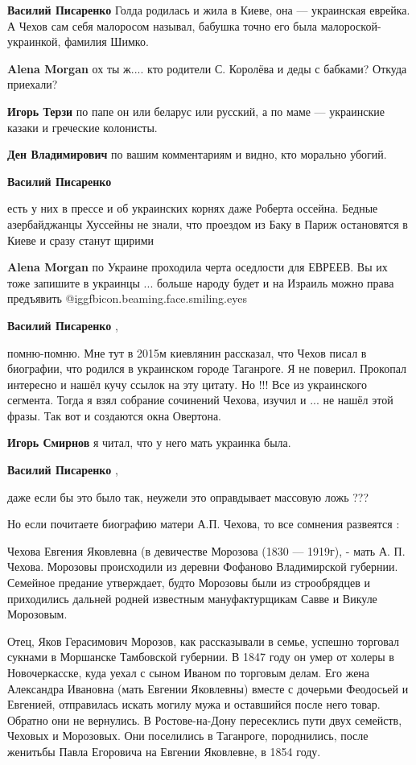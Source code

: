 \begin{itemize}
\begin{itemize}
\textbf{Василий Писаренко} Голда родилась и жила в Киеве, она — украинская еврейка. А Чехов сам себя малоросом называл, бабушка точно его была малороской-украинкой, фамилия Шимко.

\textbf{Alena Morgan} ох ты ж.... кто родители С. Королёва и деды с бабками? Откуда приехали?

\textbf{Игорь Терзи} по папе он или беларус или русский, а по маме — украинские казаки и греческие колонисты.

\textbf{Ден Владимирович} по вашим комментариям и видно, кто морально убогий.

\textbf{Василий Писаренко} 

есть у них в прессе и об украинских корнях даже Роберта оссейна. Бедные
азербайджанцы Хуссейны не знали, что проездом из Баку в Париж остановятся в
Киеве и сразу станут щирими

\textbf{Alena Morgan} по Украине проходила черта оседлости для ЕВРЕЕВ.
Вы их тоже запишите в украинцы ... больше народу будет и на Израиль можно права предъявить  @igg{fbicon.beaming.face.smiling.eyes} 

\textbf{Василий Писаренко} , 

помню-помню. Мне тут в 2015м киевлянин рассказал, что Чехов писал в биографии,
что родился в украинском городе Таганроге. Я не поверил. Прокопал интересно и
нашёл кучу ссылок на эту цитату. Но !!! Все из украинского сегмента. Тогда я
взял собрание сочинений Чехова, изучил и ... не нашёл этой фразы. Так вот и
создаются окна Овертона.


\textbf{Игорь Смирнов} я читал, что у него мать украинка была.

\textbf{Василий Писаренко} , 

даже если бы это было так, неужели это оправдывает массовую ложь ???

Но если почитаете биографию матери А.П. Чехова, то все сомнения развеятся :

Чехова Евгения Яковлевна (в девичестве Морозова (1830 — 1919г), - мать А. П.
Чехова. Морозовы происходили из деревни Фофаново Владимирской губернии.
Семейное предание утверждает, будто Морозовы были из строобрядцев и приходились
дальней родней известным мануфактурщикам Савве и Викуле Морозовым.

Отец, Яков Герасимович Морозов, как рассказывали в семье, успешно торговал
сукнами в Моршанске Тамбовской губернии. В 1847 году он умер от холеры в
Новочеркасске, куда уехал с сыном Иваном по торговым делам. Его жена Александра
Ивановна (мать Евгении Яковлевны) вместе с дочерьми Феодосьей и Евгенией,
отправилась искать могилу мужа и оставшийся после него товар. Обратно они не
вернулись. В Ростове-на-Дону пересеклись пути двух семейств, Чеховых и
Морозовых. Они поселились в Таганроге, породнились, после женитьбы Павла
Егоровича на Евгении Яковлевне, в 1854 году.



\end{itemize}
\end{itemize}
